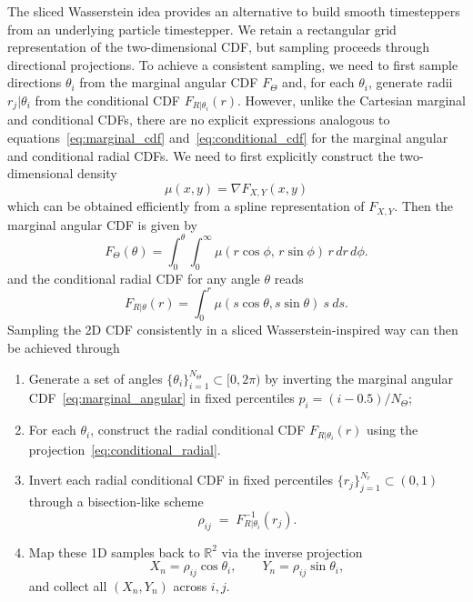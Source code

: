 \documentclass{article}
\begin{document}
The sliced Wasserstein idea provides an alternative to build smooth timesteppers from an underlying particle timestepper. We retain a rectangular grid representation of the two-dimensional CDF, but sampling proceeds through directional projections. To achieve a consistent sampling, we need to first sample directions $\theta_i$ from the marginal angular CDF $F_\Theta$ and, for each $\theta_i$, generate radii $r_j|\theta_i$ from the conditional CDF $F_{R|\theta_i}(r)$. However, unlike the Cartesian marginal and conditional CDFs, there are no explicit expressions analogous to equations~\eqref{eq:marginal_cdf} and~\eqref{eq:conditional_cdf} for the marginal angular and conditional radial CDFs. We need to first explicitly construct the two-dimensional density
\begin{equation}
    \mu(x,y) = \nabla F_{X,Y}(x,y)
\end{equation}
which can be obtained efficiently from a spline representation of $F_{X,Y}$. Then the marginal angular CDF is given by
\begin{equation} \label{eq:marginal_angular}
    F_{\Theta}(\theta)
    = \int_{0}^{\theta} \int_{0}^{\infty}
        \mu \left(r \cos\phi,\, r \sin\phi\right)\,
        r\, dr\, d\phi.
\end{equation}
and the conditional radial CDF for any angle $\theta$ reads
\begin{equation} \label{eq:conditional_radial}
    F_{R|\theta}(r) = \int_{0}^{r} \mu(s \cos\theta, s\sin\theta)\ s\ ds.
\end{equation}
Sampling the 2D CDF consistently in a sliced Wasserstein-inspired way can then be achieved through
\begin{enumerate}
  \item Generate a set of angles $\{\theta_i\}_{i=1}^{N_\Theta}\subset[0,2\pi)$ by inverting the marginal angular CDF~\eqref{eq:marginal_angular} in fixed percentiles $p_i = (i - 0.5) / N_\Theta$;
  \item For each $\theta_i$, construct the radial conditional CDF $F_{R|\theta_i}(r)$ using the projection~\eqref{eq:conditional_radial}.
  \item Invert each radial conditional CDF in fixed percentiles $\{r_j\}_{j=1}^{N_r}\subset(0,1)$ through a bisection-like scheme
        \[
          \rho_{ij} \;=\; F_{R | \theta_i}^{-1}(r_j).
        \]
  \item Map these 1D samples back to $\mathbb{R}^2$ via the inverse projection
        \[
          X_n=\rho_{ij}\cos\theta_i, \qquad Y_n=\rho_{ij}\sin\theta_i,
        \]
        and collect all $(X_n,Y_n)$ across $i,j$.
\end{enumerate}
\end{document}

